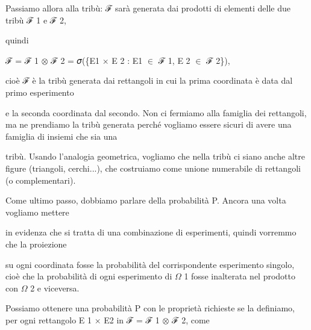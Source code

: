 \documentclass[a4paper,portrait,12pt]{article}
\begin{document}
\begin{flushleft}
Passiamo allora alla tribù: ℱ sar\`{a} generata dai prodotti di elementi delle due tribù ℱ 1 e ℱ 2,
\end{flushleft}


\begin{flushleft}
quindi
\end{flushleft}


\begin{flushleft}
ℱ = ℱ 1 $\otimes$ ℱ 2 = 𝜎(\{E1 × E 2 : E1 $\in$ ℱ 1, E 2 $\in$ ℱ 2\}),
\end{flushleft}


\begin{flushleft}
cio\`{e} ℱ \`{e} la tribù generata dai rettangoli in cui la prima coordinata \`{e} data dal primo esperimento
\end{flushleft}


\begin{flushleft}
e la seconda coordinata dal secondo. Non ci fermiamo alla famiglia dei rettangoli, ma ne prendiamo la tribù generata perch\'{e} vogliamo essere sicuri di avere una famiglia di insiemi che sia una
\end{flushleft}


\begin{flushleft}
tribù. Usando l'analogia geometrica, vogliamo che nella tribù ci siano anche altre figure (triangoli, cerchi...), che costruiamo come unione numerabile di rettangoli (o complementari).
\end{flushleft}


\begin{flushleft}
Come ultimo passo, dobbiamo parlare della probabilit\`{a} P. Ancora una volta vogliamo mettere
\end{flushleft}


\begin{flushleft}
in evidenza che si tratta di una combinazione di esperimenti, quindi vorremmo che la proiezione
\end{flushleft}


\begin{flushleft}
su ogni coordinata fosse la probabilit\`{a} del corrispondente esperimento singolo, cio\`{e} che la probabilit\`{a} di ogni esperimento di $\Omega$ 1 fosse inalterata nel prodotto con $\Omega$ 2 e viceversa.
\end{flushleft}


\begin{flushleft}
Possiamo ottenere una probabilit\`{a} P con le propriet\`{a} richieste se la definiamo, per ogni rettangolo E 1 × E2 in ℱ = ℱ 1 $\otimes$ ℱ 2, come
\end{flushleft}
\end{document}
